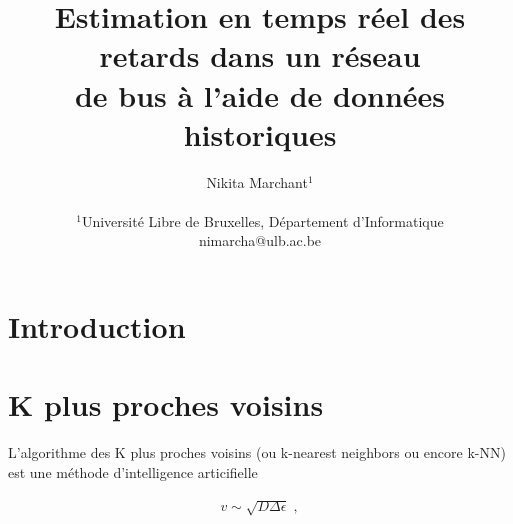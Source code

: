 \documentclass[letterpaper]{article}
\title{Estimation en temps réel des retards dans un réseau\\ de bus à l'aide de données historiques}
\author{Nikita Marchant$^{1}$\\
\mbox{}\\
$^1$Université Libre de Bruxelles, Département d'Informatique\\
nimarcha@ulb.ac.be}
\begin{document}
\maketitle

\begin{abstract}

\end{abstract}

\section{Introduction}



\section{K plus proches voisins}

L'algorithme des K plus proches voisins (ou k-nearest neighbors ou encore k-NN) est une méthode d'intelligence articifielle \citep{trevor2009elements}


\begin{eqnarray}
v\sim\sqrt{D\Delta\epsilon}\;, \label{eq4}
\end{eqnarray}


\footnotesize


\end{document}
